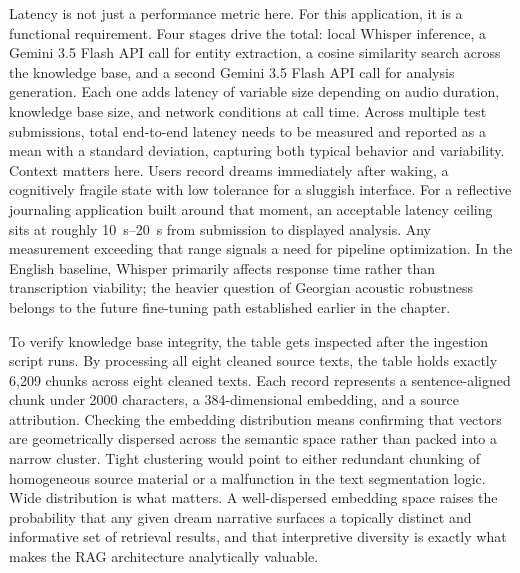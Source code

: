 \documentclass[12pt,a4paper]{report}
\DeclareRobustCommand{\code}[1]{\texttt{\detokenize{#1}}}
\begin{document}
Latency is not just a performance metric here. For this application, it is a functional requirement. Four stages drive the total: local Whisper inference, a Gemini 3.5 Flash API call for entity extraction, a \code{pgvector} cosine similarity search across the knowledge base, and a second Gemini 3.5 Flash API call for analysis generation. Each one adds latency of variable size depending on audio duration, knowledge base size, and network conditions at call time. Across multiple test submissions, total end-to-end latency needs to be measured and reported as a mean with a standard deviation, capturing both typical behavior and variability. Context matters here. Users record dreams immediately after waking, a cognitively fragile state with low tolerance for a sluggish interface. For a reflective journaling application built around that moment, an acceptable latency ceiling sits at roughly \SIrange{10}{20}{\second} from submission to displayed analysis. Any measurement exceeding that range signals a need for pipeline optimization. In the English baseline, Whisper primarily affects response time rather than transcription viability; the heavier question of Georgian acoustic robustness belongs to the future fine-tuning path established earlier in the chapter.

To verify knowledge base integrity, the \code{knowledge_base} table gets inspected after the ingestion script runs. By processing all eight cleaned source texts, the table holds exactly 6,209 chunks across eight cleaned texts. Each record represents a sentence-aligned chunk under \num{2000} characters, a \num{384}-dimensional embedding, and a source attribution. Checking the embedding distribution means confirming that vectors are geometrically dispersed across the semantic space rather than packed into a narrow cluster. Tight clustering would point to either redundant chunking of homogeneous source material or a malfunction in the text segmentation logic. Wide distribution is what matters. A well-dispersed embedding space raises the probability that any given dream narrative surfaces a topically distinct and informative set of retrieval results, and that interpretive diversity is exactly what makes the RAG architecture analytically valuable.
\end{document}

